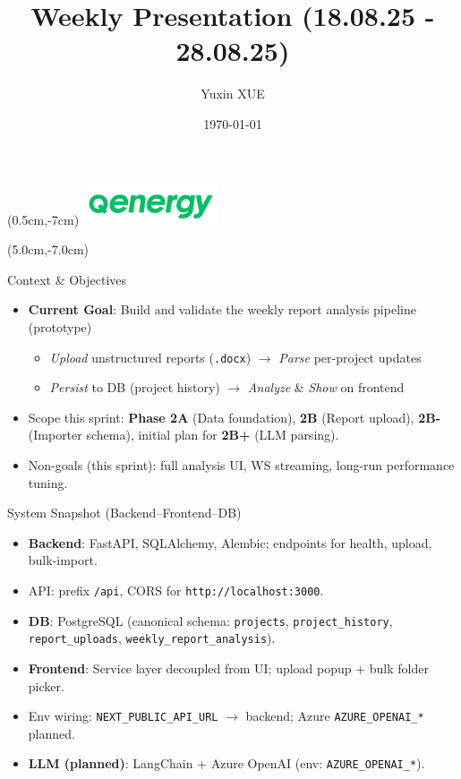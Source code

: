 \documentclass [aspectratio=169]{beamer}
\title[]{Weekly Presentation (18.08.25 - 28.08.25)}
\author[]{Yuxin XUE}
\institute[]{Faculty IV -- Electrical Engineering and Computer Science\\
Technische Universität Berlin}
\date{\today}
\begin{document}
{
\begin{frame}
    \titlepage
    \begin{textblock*}{4cm}(0.5cm,-7cm)
        \includegraphics[width=4cm]{qenergy.png}
    \end{textblock*}
    \begin{textblock*}{8cm}(5.0cm,-7.0cm)
        \huge {}
    \end{textblock*}
\end{frame}
}

\begin{frame}{Context \& Objectives}
\begin{itemize}
    \item \textbf{Current Goal}: Build and validate the weekly report analysis pipeline (prototype)
    \begin{itemize}
        \item \textit{Upload} unstructured reports (\texttt{.docx}) $\rightarrow$ \textit{Parse} per-project updates
        \item \textit{Persist} to DB (project history) $\rightarrow$ \textit{Analyze} \& \textit{Show} on frontend
    \end{itemize}
    \item Scope this sprint: \textbf{Phase 2A} (Data foundation), \textbf{2B} (Report upload), \textbf{2B-} (Importer schema), initial plan for \textbf{2B+} (LLM parsing).
    \item Non-goals (this sprint): full analysis UI, WS streaming, long-run performance tuning.
\end{itemize}
\end{frame}

\begin{frame}{System Snapshot (Backend–Frontend–DB)}
\begin{itemize}
    \item \textbf{Backend}: FastAPI, SQLAlchemy, Alembic; endpoints for health, upload, bulk-import.
    \item API: prefix \texttt{/api}, CORS for \texttt{http://localhost:3000}.
    \item \textbf{DB}: PostgreSQL (canonical schema: \texttt{projects}, \texttt{project\_history}, \texttt{report\_uploads}, \texttt{weekly\_report\_analysis}).
    \item \textbf{Frontend}: Service layer decoupled from UI; upload popup + bulk folder picker.
    \item Env wiring: \texttt{NEXT\_PUBLIC\_API\_URL} $\rightarrow$ backend; Azure \texttt{AZURE\_OPENAI\_*} planned.
    \item \textbf{LLM (planned)}: LangChain + Azure OpenAI (env: \texttt{AZURE\_OPENAI\_*}).
\end{itemize}
\end{frame}
\end{document}
